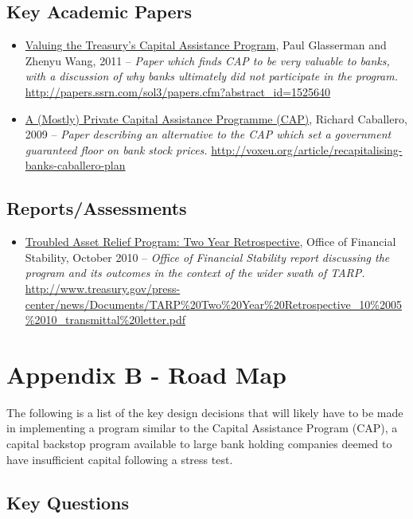 \documentclass[12pt]{article}
\begin{document}
\subsection{Key Academic Papers}

\begin{itemize}
\item
\ul{Valuing the Treasury's Capital Assistance Program},
Paul Glasserman and Zhenyu Wang, 2011 -- \emph{Paper
which finds CAP to be very valuable to banks, with a discussion of why banks ultimately did not participate in the program.} \url{http://papers.ssrn.com/sol3/papers.cfm?abstract_id=1525640}
\item
\ul{A (Mostly) Private Capital Assistance Programme
(CAP)},
Richard Caballero, 2009 -- \emph{Paper describing an alternative to the CAP which set a government guaranteed floor on bank stock prices.} \url{http://voxeu.org/article/recapitalising-banks-caballero-plan}
\end{itemize}
\subsection{Reports/Assessments}

\begin{itemize}
\item
\ul{Troubled
  Asset Relief Program: Two Year Retrospective}, Office of Financial
  Stability, October 2010 -- \emph{Office of Financial Stability report
  discussing the program and its outcomes in the context of the wider
  swath of TARP.} \url{http://www.treasury.gov/press-center/news/Documents/TARP\%20Two\%20Year\%20Retrospective_10\%2005\%2010_transmittal\%20letter.pdf}
\end{itemize}

\section{Appendix B - Road Map}

The following is a list of the key design decisions that will likely have to be made in implementing a program similar to the Capital Assistance Program (CAP), a  capital backstop program available to large bank holding companies deemed to have insufficient capital following a stress test.

\subsection{Key Questions}
\end{document}
